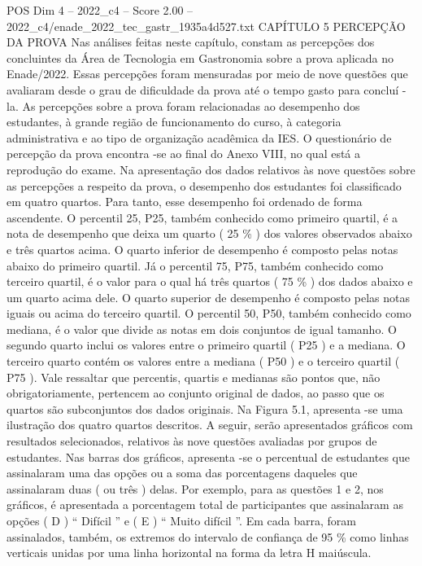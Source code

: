 \begin{textsample}{POS Dim 4 – 2022\_c4 – Score 2.00 – 2022\_c4/enade\_2022\_tec\_gastr\_1935a4d527.txt}  \label{ex:f4_pos_141}
CAPÍTULO 5 PERCEPÇÃO DA PROVA Nas análises feitas neste capítulo, constam as percepções dos concluintes da Área de Tecnologia em Gastronomia sobre a prova aplicada no Enade/2022.
Essas percepções foram mensuradas por meio de nove questões que avaliaram desde o grau de dificuldade da prova até o tempo gasto para concluí -la.
As percepções sobre a prova foram relacionadas ao desempenho dos estudantes, à grande região de funcionamento do curso, à categoria administrativa e ao tipo de organização acadêmica da IES.
O questionário de percepção da prova encontra -se ao final do Anexo VIII, no qual está a reprodução do exame.
Na apresentação dos dados relativos às nove questões sobre as percepções a respeito da prova, o desempenho dos estudantes foi classificado em quatro quartos.
Para tanto, esse desempenho foi ordenado de forma ascendente.
O percentil 25, P25, também conhecido como primeiro quartil, é a nota de desempenho que deixa um quarto ( 25 \% ) dos valores observados abaixo e três quartos acima.
O quarto inferior de desempenho é composto pelas notas abaixo do primeiro quartil.
Já o percentil 75, P75, também conhecido como terceiro quartil, é o valor para o qual há três quartos ( 75 \% ) dos dados abaixo e um quarto acima dele.
O quarto superior de desempenho é composto pelas notas iguais ou acima do terceiro quartil.
O percentil 50, P50, também conhecido como mediana, é o valor que divide as notas em dois conjuntos de igual tamanho.
O segundo quarto inclui os valores entre o primeiro quartil ( P25 ) e a mediana.
O terceiro quarto contém os valores entre a mediana ( P50 ) e o terceiro quartil ( P75 ).
Vale ressaltar que percentis, quartis e medianas são pontos que, não obrigatoriamente, pertencem ao conjunto original de dados, ao passo que os quartos são subconjuntos dos dados originais.
Na Figura 5.1, apresenta -se uma ilustração dos quatro quartos descritos.
A seguir, serão apresentados gráficos com resultados selecionados, relativos às nove questões avaliadas por grupos de estudantes.
Nas barras dos gráficos, apresenta -se o percentual de estudantes que assinalaram uma das opções ou a soma das porcentagens daqueles que assinalaram duas ( ou três ) delas.
Por exemplo, para as questões 1 e 2, nos gráficos, é apresentada a porcentagem total de participantes que assinalaram as opções ( D ) “ Difícil ” e ( E ) “ Muito difícil ”.
Em cada barra, foram assinalados, também, os extremos do intervalo de confiança de 95 \% como linhas verticais unidas por uma linha horizontal na forma da letra H maiúscula.

\end{textsample}
